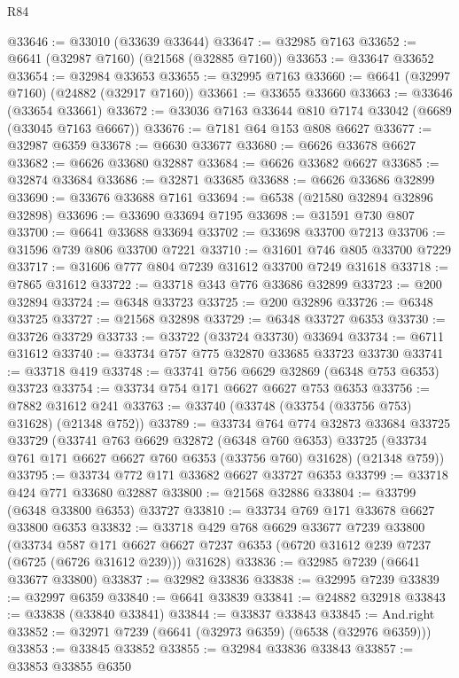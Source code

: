 \begin{lexlean}{R84}
\begin{coremodule}
@33646 := @33010 (@33639 @33644)
@33647 := @32985 @7163
@33652 := @6641 (@32987 @7160) (@21568 (@32885 @7160))
@33653 := @33647 @33652
@33654 := @32984 @33653
@33655 := @32995 @7163
@33660 := @6641 (@32997 @7160) (@24882 (@32917 @7160))
@33661 := @33655 @33660
@33663 := @33646 (@33654 @33661)
@33672 := @33036 @7163 @33644 @810 @7174 @33042 (@6689 (@33045 @7163 @6667))
@33676 := @7181 @64 @153 @808 @6627
@33677 := @32987 @6359
@33678 := @6630 @33677
@33680 := @6626 @33678 @6627
@33682 := @6626 @33680 @32887
@33684 := @6626 @33682 @6627
@33685 := @32874 @33684
@33686 := @32871 @33685
@33688 := @6626 @33686 @32899
@33690 := @33676 @33688 @7161
@33694 := @6538 (@21580 @32894 @32896 @32898)
@33696 := @33690 @33694 @7195
@33698 := @31591 @730 @807
@33700 := @6641 @33688 @33694
@33702 := @33698 @33700 @7213
@33706 := @31596 @739 @806 @33700 @7221
@33710 := @31601 @746 @805 @33700 @7229
@33717 := @31606 @777 @804 @7239 @31612 @33700 @7249 @31618
@33718 := @7865 @31612
@33722 := @33718 @343 @776 @33686 @32899
@33723 := @200 @32894
@33724 := @6348 @33723
@33725 := @200 @32896
@33726 := @6348 @33725
@33727 := @21568 @32898
@33729 := @6348 @33727 @6353
@33730 := @33726 @33729
@33733 := @33722 (@33724 @33730) @33694
@33734 := @6711 @31612
@33740 := @33734 @757 @775 @32870 @33685 @33723 @33730
@33741 := @33718 @419
@33748 := @33741 @756 @6629 @32869 (@6348 @753 @6353) @33723
@33754 := @33734 @754 @171 @6627 @6627 @753 @6353
@33756 := @7882 @31612 @241
@33763 := @33740 (@33748 (@33754 (@33756 @753) @31628) (@21348 @752))
@33789 := @33734
    @764
    @774
    @32873
    @33684
    @33725
    @33729
    (@33741
      @763
      @6629
      @32872
      (@6348 @760 @6353)
      @33725
      (@33734 @761 @171 @6627 @6627 @760 @6353 (@33756 @760) @31628)
      (@21348 @759))
@33795 := @33734 @772 @171 @33682 @6627 @33727 @6353
@33799 := @33718 @424 @771 @33680 @32887
@33800 := @21568 @32886
@33804 := @33799 (@6348 @33800 @6353) @33727
@33810 := @33734 @769 @171 @33678 @6627 @33800 @6353
@33832 := @33718
    @429
    @768
    @6629
    @33677
    @7239
    @33800
    (@33734
      @587
      @171
      @6627
      @6627
      @7237
      @6353
      (@6720 @31612 @239 @7237 (@6725 (@6726 @31612 @239)))
      @31628)
@33836 := @32985 @7239 (@6641 @33677 @33800)
@33837 := @32982 @33836
@33838 := @32995 @7239
@33839 := @32997 @6359
@33840 := @6641 @33839
@33841 := @24882 @32918
@33843 := @33838 (@33840 @33841)
@33844 := @33837 @33843
@33845 := And.right
@33852 := @32971 @7239 (@6641 (@32973 @6359) (@6538 (@32976 @6359)))
@33853 := @33845 @33852
@33855 := @32984 @33836 @33843
@33857 := @33853 @33855 @6350

\end{coremodule}
\end{lexlean}
